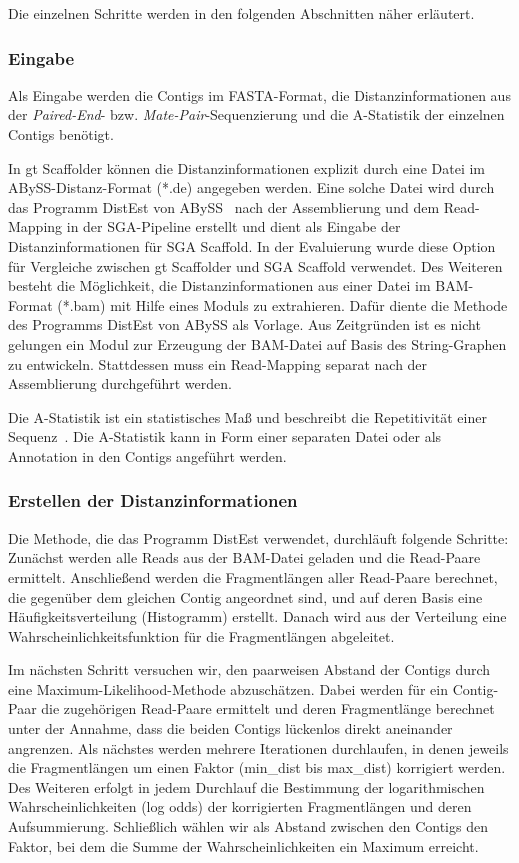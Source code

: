 \documentclass[a4paper,11pt,parskip,abstract=on]{scrartcl}
\begin{document}
Die einzelnen Schritte werden in den folgenden Abschnitten näher erläutert.

\subsubsection{Eingabe}
Als Eingabe werden die Contigs im FASTA-Format, die
Distanzinformationen aus der \textit{Paired-End}-
bzw. \textit{Mate-Pair}-Sequenzierung und die A-Statistik der einzelnen
Contigs benötigt.

In gt Scaffolder können die Distanzinformationen explizit durch eine
Datei im ABySS-Distanz-Format (*.de) angegeben werden. Eine solche
Datei wird durch das Programm DistEst von ABySS~\cite{abyss} nach der Assemblierung
und dem Read-Mapping in der SGA-Pipeline erstellt und dient als
Eingabe der Distanzinformationen für SGA Scaffold. In der Evaluierung
wurde diese Option für Vergleiche zwischen gt Scaffolder und SGA Scaffold
verwendet. Des Weiteren besteht die Möglichkeit, die Distanzinformationen aus
einer Datei im BAM-Format (*.bam) mit Hilfe eines Moduls zu
extrahieren. Dafür diente die Methode des Programms DistEst von ABySS
als Vorlage. Aus Zeitgründen ist es nicht gelungen ein Modul zur Erzeugung
der BAM-Datei auf Basis des String-Graphen zu entwickeln.
Stattdessen muss ein Read-Mapping separat nach der Assemblierung
durchgeführt werden.

Die A-Statistik ist ein statistisches Maß und beschreibt die Repetitivität
einer Sequenz~\cite{Myers:2005iq}. Die A-Statistik kann in Form einer
separaten Datei oder als Annotation in den Contigs angeführt werden.

\subsubsection{Erstellen der Distanzinformationen} Die Methode, die das
Programm DistEst verwendet, durchläuft folgende Schritte: Zunächst werden alle
Reads aus der BAM-Datei geladen und die Read-Paare ermittelt. Anschließend
werden die Fragmentlängen aller Read-Paare berechnet, die gegenüber dem
gleichen Contig angeordnet sind, und auf deren Basis eine
Häufigkeitsverteilung (Histogramm) erstellt. Danach wird aus der Verteilung eine
Wahrscheinlichkeitsfunktion für die Fragmentlängen abgeleitet.

Im nächsten Schritt versuchen wir, den paarweisen Abstand der Contigs durch
eine Maximum-Likelihood-Methode abzuschätzen. Dabei werden für ein Contig-Paar die
zugehörigen Read-Paare ermittelt und deren Fragmentlänge berechnet unter der
Annahme, dass die beiden Contigs lückenlos direkt aneinander angrenzen. Als
nächstes werden mehrere Iterationen durchlaufen, in denen jeweils die
Fragmentlängen um einen Faktor (min\_dist bis max\_dist) korrigiert werden.
Des Weiteren erfolgt in jedem Durchlauf die Bestimmung der logarithmischen
Wahrscheinlichkeiten (log odds) der korrigierten Fragmentlängen und deren
Aufsummierung. Schließlich wählen wir als Abstand zwischen den Contigs
den Faktor, bei dem die Summe der Wahrscheinlichkeiten ein Maximum erreicht.
\end{document}
